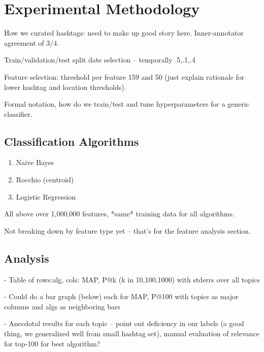 \documentclass[letterpaper]{article}
\begin{document}
\section{Experimental Methodology}

How we curated hashtags: need to make up good story here.  Inner-annotator agreement of 3/4.

Train/validation/test split date selection -- temporally .5,.1,.4

Feature selection: threshold per feature 159 and 50 (just explain rationale for lower hashtag and location thresholds).

Formal notation, how do we train/test and tune hyperparameters for a generic classifier.

\subsection{Classification Algorithms}

\begin{enumerate}
\item Naive Bayes
\item Rocchio (centroid)
\item Logistic Regression
\end{enumerate}

All above over 1,000,000 features, *same* training data for all algorithms.

Not breaking down by feature type yet -- that's for the feature analysis section.

\subsection{Analysis}

- Table of rows:alg, cols: MAP, P@k (k in {10,100,1000}) with stderrs over all topics

- Could do a bar graph (below) each for MAP, P@100 with topics as major columns and algs as neighboring bars

- Anecdotal results for each topic -- point out deficiency in our labels (a good thing, we generalized well from small hashtag set), manual evaluation of relevance for top-100 for best algorithm?
\end{document}
